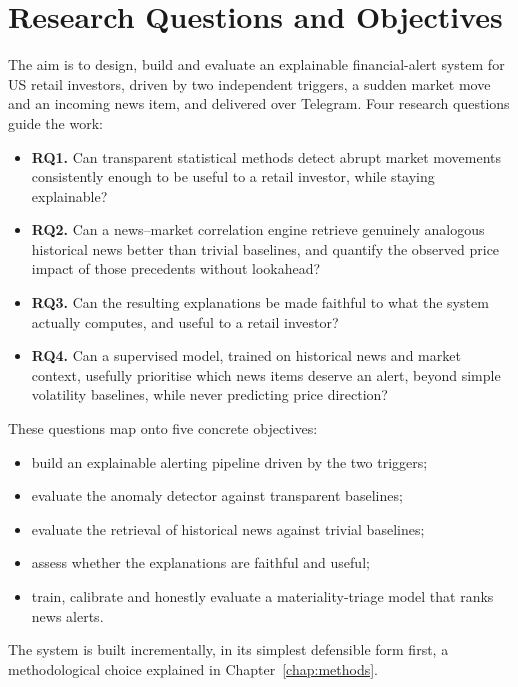 \section{Research Questions and Objectives}
\label{sec:intro_objectives}

The aim is to design, build and evaluate an explainable financial-alert system for US retail investors,
driven by two independent triggers, a sudden market move and an incoming news item, and delivered over
Telegram. Four research questions guide the work:

\begin{itemize}
  \item \textbf{\gls{RQ}1.} Can transparent statistical methods detect abrupt market movements
        consistently enough to be useful to a retail investor, while staying explainable?
  \item \textbf{\gls{RQ}2.} Can a news--market correlation engine retrieve genuinely analogous historical
        news better than trivial baselines, and quantify the observed price impact of those precedents
        without lookahead?
  \item \textbf{\gls{RQ}3.} Can the resulting explanations be made faithful to what the system actually
        computes, and useful to a retail investor?
  \item \textbf{\gls{RQ}4.} Can a supervised model, trained on historical news and market context,
        usefully prioritise which news items deserve an alert, beyond simple volatility baselines,
        while never predicting price direction?
\end{itemize}

These questions map onto five concrete objectives:
\begin{itemize}
  \item build an explainable alerting pipeline driven by the two triggers;
  \item evaluate the anomaly detector against transparent baselines;
  \item evaluate the retrieval of historical news against trivial baselines;
  \item assess whether the explanations are faithful and useful;
  \item train, calibrate and honestly evaluate a materiality-triage model that ranks news alerts.
\end{itemize}
The system is built incrementally, in its simplest defensible form first, a methodological choice
explained in Chapter~\ref{chap:methods}.

